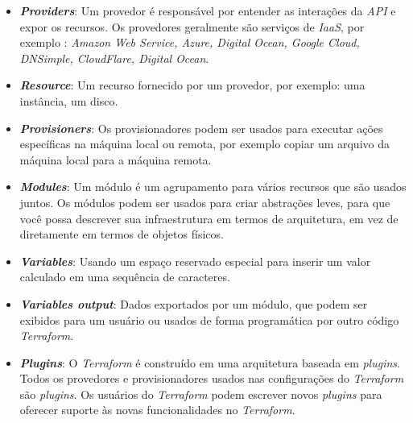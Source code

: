 \begin{itemize}
\item \textbf{\textit{Providers}}: Um provedor é responsável por entender as interações da \textit{API} e expor os recursos. Os provedores geralmente são serviços de \textit{IaaS},  por exemplo : \textit{Amazon
Web Service, Azure, Digital Ocean, Google Cloud, DNSimple, CloudFlare, Digital Ocean}.

\item \textbf{\textit{Resource}}: Um recurso fornecido por um provedor, por exemplo: uma instância, um disco.   

\item \textbf{\textit{Provisioners}}: Os provisionadores podem ser usados para executar ações específicas na máquina local ou remota, por exemplo copiar um arquivo da máquina local para a máquina remota.

\item \textbf{\textit{Modules}}: Um módulo é um agrupamento para vários recursos que são usados juntos. Os módulos podem ser usados para criar abstrações leves, para que você possa descrever sua infraestrutura em termos de arquitetura, em vez de diretamente em termos de objetos físicos.

\item \textbf{\textit{Variables}}: Usando um espaço reservado especial para inserir um valor calculado em uma sequência de caracteres. 

 \item \textbf{\textit{Variables output}}: Dados exportados por um módulo, que podem ser exibidos para um usuário  ou usados de forma programática por outro código \textit{Terraform}.
 
 \item \textbf{\textit{Plugins}}: O \textit{Terraform} é construído em uma arquitetura baseada em \textit{plugins}. Todos os provedores e provisionadores usados nas configurações do \textit{Terraform} são \textit{plugins}. Os usuários do \textit{Terraform} podem escrever novos \textit{plugins} para oferecer suporte às novas funcionalidades no \textit{Terraform}.
 \end{itemize}
  
